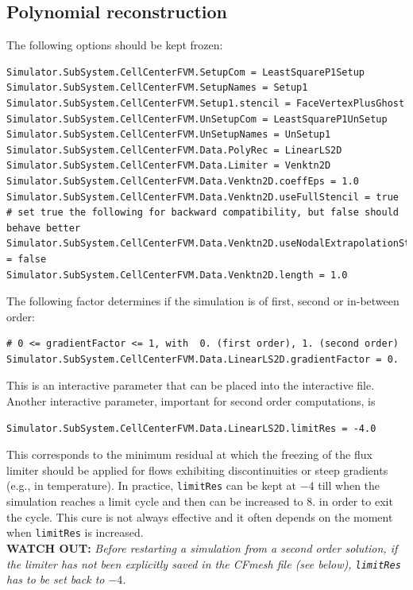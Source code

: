 \documentclass[11pt]{article}
\begin{document}
\subsection{Polynomial reconstruction}

The following options should be kept frozen:

\begin{verbatim}
Simulator.SubSystem.CellCenterFVM.SetupCom = LeastSquareP1Setup
Simulator.SubSystem.CellCenterFVM.SetupNames = Setup1
Simulator.SubSystem.CellCenterFVM.Setup1.stencil = FaceVertexPlusGhost
Simulator.SubSystem.CellCenterFVM.UnSetupCom = LeastSquareP1UnSetup
Simulator.SubSystem.CellCenterFVM.UnSetupNames = UnSetup1
Simulator.SubSystem.CellCenterFVM.Data.PolyRec = LinearLS2D
Simulator.SubSystem.CellCenterFVM.Data.Limiter = Venktn2D
Simulator.SubSystem.CellCenterFVM.Data.Venktn2D.coeffEps = 1.0
Simulator.SubSystem.CellCenterFVM.Data.Venktn2D.useFullStencil = true
# set true the following for backward compatibility, but false should behave better
Simulator.SubSystem.CellCenterFVM.Data.Venktn2D.useNodalExtrapolationStencil = false
Simulator.SubSystem.CellCenterFVM.Data.Venktn2D.length = 1.0
\end{verbatim}

The following factor determines if the simulation is of first, second or in-between order:

\begin{verbatim}
# 0 <= gradientFactor <= 1, with  0. (first order), 1. (second order)
Simulator.SubSystem.CellCenterFVM.Data.LinearLS2D.gradientFactor = 0.
\end{verbatim}
This is an interactive parameter that can be placed into the interactive file. Another interactive parameter,
important for second order computations, is 

\begin{verbatim}
Simulator.SubSystem.CellCenterFVM.Data.LinearLS2D.limitRes = -4.0
\end{verbatim}
This corresponds to the minimum residual at which the freezing of the flux limiter should be applied for flows exhibiting discontinuities 
or steep gradients (e.g., in temperature). In practice, {\tt limitRes} can be kept at  $-4$ till when the simulation reaches a limit cycle and then can be increased to
$8.$ in order to exit the cycle. This cure is not always effective and it often depends on the moment when {\tt limitRes} is increased.\\
{\bf WATCH OUT:} {\it Before restarting a simulation from a second order solution, if the limiter has not been explicitly saved in the CFmesh file 
  (see below), {\tt limitRes} has to be set back to $-4$.}
\end{document}
